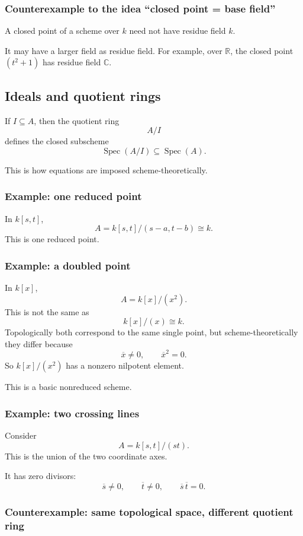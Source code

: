 \documentclass[12pt,a4paper]{article}
\theoremstyle{notespace}
\newcommand{\Spec}{\operatorname{Spec}}
\theoremstyle{definition}
\begin{document}
\subsubsection{Counterexample to the idea ``closed point = base field''}

A closed point of a scheme over \(k\) need not have residue field \(k\).

It may have a larger field as residue field. For example, over \(\mathbb R\), the closed point \((t^2+1)\) has residue field \(\mathbb C\).

\subsection{Ideals and quotient rings}

If \(I\subseteq A\), then the quotient ring
\[
A/I
\]
defines the closed subscheme
\[
\Spec(A/I)\subseteq \Spec(A).
\]

This is how equations are imposed scheme-theoretically.

\subsubsection{Example: one reduced point}

In \(k[s,t]\),
\[
A=k[s,t]/(s-a,t-b)\cong k.
\]
This is one reduced point.

\subsubsection{Example: a doubled point}

In \(k[x]\),
\[
A=k[x]/(x^2).
\]
This is not the same as
\[
k[x]/(x)\cong k.
\]
Topologically both correspond to the same single point, but scheme-theoretically they differ because
\[
\overline{x}\neq 0,
\qquad
\overline{x}^2=0.
\]
So \(k[x]/(x^2)\) has a nonzero nilpotent element.

This is a basic nonreduced scheme.

\subsubsection{Example: two crossing lines}

Consider
\[
A=k[s,t]/(st).
\]
This is the union of the two coordinate axes.

It has zero divisors:
\[
\overline{s}\neq 0,\qquad \overline{t}\neq 0,\qquad \overline{s}\,\overline{t}=0.
\]

\subsubsection{Counterexample: same topological space, different quotient ring}
\end{document}
